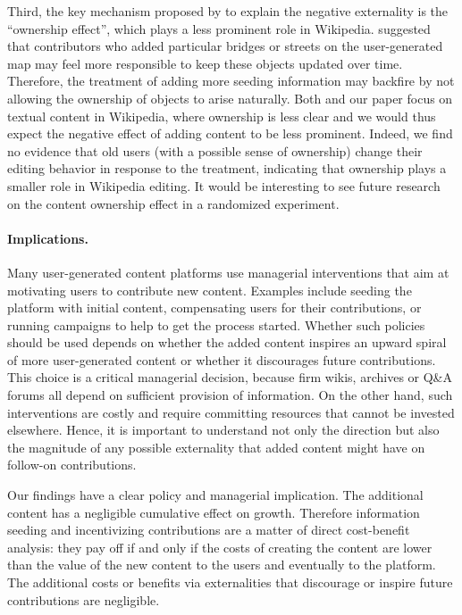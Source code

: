 \documentclass[12pt]{article}
\begin{document}
Third, the key mechanism proposed by \cite{nagaraj2017information} to explain the negative externality is the ``ownership effect'', which plays a less prominent role in Wikipedia. \cite{nagaraj2017information} suggested that contributors who added particular bridges or streets on the user-generated map may feel more responsible to keep these objects updated over time. Therefore, the treatment of adding more seeding information may backfire by not allowing the ownership of objects to arise naturally. Both \cite{aaltonen-seiler-2016} and our paper focus on textual content in Wikipedia, where ownership is less clear and we would thus expect the negative effect of adding content to be less prominent. Indeed, we find no evidence that old users (with a possible sense of ownership) change their editing behavior in response to the treatment, indicating that ownership plays a smaller role in Wikipedia editing. It would be interesting to see future research on the content ownership effect in a randomized experiment.

\paragraph{Implications.}
Many user-generated content platforms use managerial interventions that aim at motivating users to contribute new content. Examples include seeding the platform with initial content, compensating users for their contributions, or running campaigns to help to get the process started. Whether such policies should be used depends on whether the added content inspires an upward spiral of more user-generated content or whether it discourages future contributions. This choice is a critical managerial decision, because firm wikis, archives or Q\&A forums all depend on sufficient provision of information. On the other hand, such interventions are costly and require committing resources that cannot be invested elsewhere. Hence, it is important to understand not only the direction but also the magnitude of any possible externality that added content might have on follow-on contributions.

Our findings have a clear policy and managerial implication. The additional content has a negligible cumulative effect on growth. Therefore information seeding and incentivizing contributions are a matter of direct cost-benefit analysis: they pay off if and only if the costs of creating the content are lower than the value of the new content to the users and eventually to the platform. The additional costs or benefits via externalities that discourage or inspire future contributions are negligible. 
\end{document}
